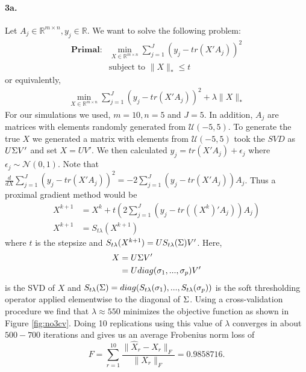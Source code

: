 \documentclass[12pt, leqno]{article}
\providecommand{\norm}[1]{\lVert#1\rVert}
\let\oldhat\hat
\renewcommand{\hat}[1]{\oldhat{{#1}}}
\def\s{\ensuremath\Sigma}
\begin{document}
\paragraph{3a.} Let $A_j \in \mathbb{R}^{m \times n}, y_j \in
\mathbb{R}$. We want to solve the following problem: 
\begin{align*}
\textbf{Primal:}&\min_{X \in \mathbb{R}^{m \times n}} \sum_{j = 1}^J
                  (y_j - tr(X'A_j))^2 \\
&\text{subject to } \norm{X}_* \leq t
\end{align*}
or equivalently,
\begin{align*}
\min_{X \in \mathbb{R}^{m \times n}} \sum_{j = 1}^J
                  (y_j - tr(X'A_j))^2 + \lambda \norm{X}_*
\end{align*} 
For our simulations we used, $m = 10,n = 5$ and $J = 5$. In addition,
$A_j$ are matrices with elements randomly generated from
$\mathcal{U}(-5,5)$. To generate the true $X$ we generated a matrix
with elements from $\mathcal{U}(-5,5)$ took the $SVD$ as $U \s V'$ and set
$X = UV'$. We then calculated $y_j =  tr(X'A_j) +
\epsilon_j$ where $\epsilon_j \sim \mathcal{N}(0,1)$. 
Note that $\frac{d}{dX} \sum_{j = 1}^J
                  (y_j - tr(X'A_j))^2 = -2 \sum_{j = 1}^J(y_j -
                  tr(X'A_j))A_j$.
Thus a proximal gradient method would be
\begin{align}
X^{k+1} &= X^{k} + t(2 \sum_{j = 1}^J(y_j -
                  tr((X^k)'A_j))A_j) \\
X^{k+1} &= S_{t\lambda}(X^{k+1})
\end{align}
where $t$ is the stepsize and $S_{t\lambda}(X^{k+1}) =
 U S_{t\lambda}(\s) V'$. Here, 
\begin{align*}
X &= U \s V' \\ 
&= U diag(\sigma_1,...,\sigma_p) V' 
\end{align*} 
is the SVD of $X$ and $S_{t\lambda}(\s) =
diag(S_{t\lambda}(\sigma_1),...,S_{t\lambda}(\sigma_p))$ is the soft
thresholding operator applied elementwise to the diagonal of $\s$.
Using a cross-validation procedure we find that $\lambda \approx 550$
minimizes the objective function as shown in Figure \ref{fig:no3cv}. Doing 10 replications using this
value of $\lambda$ converges in about $500-700$ iterations and gives
us an average Frobenius norm loss of
\[
F = \sum_{r = 1}^{10}\frac{\norm{\hat{X}_r-X_r}_F}{\norm{X_r}_F} =   0.9858716.
\]
\end{document}
